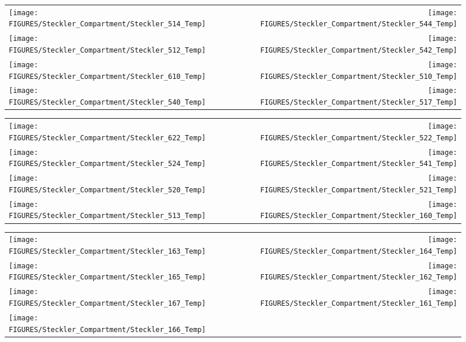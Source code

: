 \begin{figure}[p]
\begin{tabular*}{\textwidth}{l@{\extracolsep{\fill}}r}
\texttt{[image: FIGURES/Steckler\_Compartment/Steckler\_514\_Temp]} &
\texttt{[image: FIGURES/Steckler\_Compartment/Steckler\_544\_Temp]} \\
\texttt{[image: FIGURES/Steckler\_Compartment/Steckler\_512\_Temp]} &
\texttt{[image: FIGURES/Steckler\_Compartment/Steckler\_542\_Temp]} \\
\texttt{[image: FIGURES/Steckler\_Compartment/Steckler\_610\_Temp]} &
\texttt{[image: FIGURES/Steckler\_Compartment/Steckler\_510\_Temp]} \\
\texttt{[image: FIGURES/Steckler\_Compartment/Steckler\_540\_Temp]} &
\texttt{[image: FIGURES/Steckler\_Compartment/Steckler\_517\_Temp]}
\end{tabular*}
\label{Steckler_Temp_5}
\end{figure}

\begin{figure}[p]
\begin{tabular*}{\textwidth}{l@{\extracolsep{\fill}}r}
\texttt{[image: FIGURES/Steckler\_Compartment/Steckler\_622\_Temp]} &
\texttt{[image: FIGURES/Steckler\_Compartment/Steckler\_522\_Temp]} \\
\texttt{[image: FIGURES/Steckler\_Compartment/Steckler\_524\_Temp]} &
\texttt{[image: FIGURES/Steckler\_Compartment/Steckler\_541\_Temp]} \\
\texttt{[image: FIGURES/Steckler\_Compartment/Steckler\_520\_Temp]} &
\texttt{[image: FIGURES/Steckler\_Compartment/Steckler\_521\_Temp]} \\
\texttt{[image: FIGURES/Steckler\_Compartment/Steckler\_513\_Temp]} &
\texttt{[image: FIGURES/Steckler\_Compartment/Steckler\_160\_Temp]}
\end{tabular*}
\label{Steckler_Temp_6}
\end{figure}

\begin{figure}[p]
\begin{tabular*}{\textwidth}{l@{\extracolsep{\fill}}r}
\texttt{[image: FIGURES/Steckler\_Compartment/Steckler\_163\_Temp]} &
\texttt{[image: FIGURES/Steckler\_Compartment/Steckler\_164\_Temp]} \\
\texttt{[image: FIGURES/Steckler\_Compartment/Steckler\_165\_Temp]} &
\texttt{[image: FIGURES/Steckler\_Compartment/Steckler\_162\_Temp]} \\
\texttt{[image: FIGURES/Steckler\_Compartment/Steckler\_167\_Temp]} &
\texttt{[image: FIGURES/Steckler\_Compartment/Steckler\_161\_Temp]} \\
\texttt{[image: FIGURES/Steckler\_Compartment/Steckler\_166\_Temp]} &
\end{tabular*}
\label{Steckler_Temp_7}
\end{figure}

